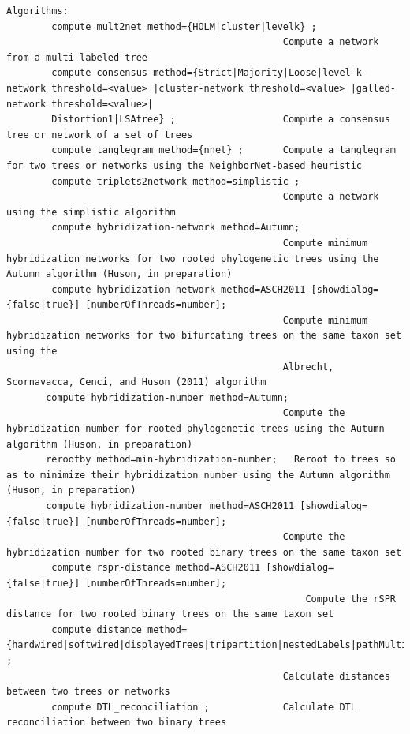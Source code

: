 \documentclass[11pt]{article}
\begin{document}
\begin{verbatim}
Algorithms:
        compute mult2net method={HOLM|cluster|levelk} ; 
                                                 Compute a network from a multi-labeled tree
        compute consensus method={Strict|Majority|Loose|level-k-network threshold=<value> |cluster-network threshold=<value> |galled-network threshold=<value>|
        Distortion1|LSAtree} ;                   Compute a consensus tree or network of a set of trees
        compute tanglegram method={nnet} ;       Compute a tanglegram for two trees or networks using the NeighborNet-based heuristic
        compute triplets2network method=simplistic ; 
                                                 Compute a network using the simplistic algorithm
        compute hybridization-network method=Autumn;
                                                 Compute minimum hybridization networks for two rooted phylogenetic trees using the Autumn algorithm (Huson, in preparation)
        compute hybridization-network method=ASCH2011 [showdialog={false|true}] [numberOfThreads=number];
                                                 Compute minimum hybridization networks for two bifurcating trees on the same taxon set using the
                                                 Albrecht, Scornavacca, Cenci, and Huson (2011) algorithm                                         
       compute hybridization-number method=Autumn;
                                                 Compute the hybridization number for rooted phylogenetic trees using the Autumn algorithm (Huson, in preparation)
       rerootby method=min-hybridization-number;   Reroot to trees so as to minimize their hybridization number using the Autumn algorithm (Huson, in preparation)
       compute hybridization-number method=ASCH2011 [showdialog={false|true}] [numberOfThreads=number];   
                                                 Compute the hybridization number for two rooted binary trees on the same taxon set 
        compute rspr-distance method=ASCH2011 [showdialog={false|true}] [numberOfThreads=number];                                               
	                                                 Compute the rSPR distance for two rooted binary trees on the same taxon set 
        compute distance method={hardwired|softwired|displayedTrees|tripartition|nestedLabels|pathMultiplicity} ;     
                                                 Calculate distances between two trees or networks
        compute DTL_reconciliation ;             Calculate DTL reconciliation between two binary trees


\end{verbatim}
\end{document}
